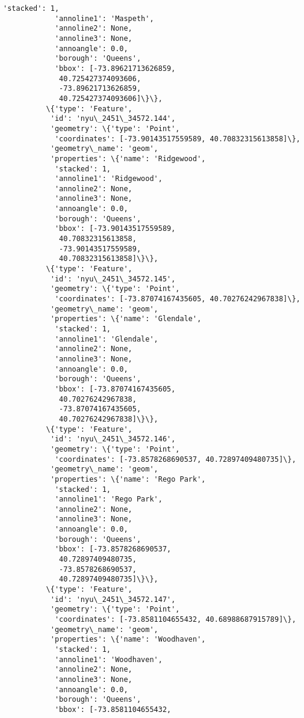 \documentclass[11pt]{article}
\begin{document}
\begin{Verbatim}[commandchars=\\\{\}]
            'stacked': 1,
            'annoline1': 'Maspeth',
            'annoline2': None,
            'annoline3': None,
            'annoangle': 0.0,
            'borough': 'Queens',
            'bbox': [-73.89621713626859,
             40.725427374093606,
             -73.89621713626859,
             40.725427374093606]\}\},
          \{'type': 'Feature',
           'id': 'nyu\_2451\_34572.144',
           'geometry': \{'type': 'Point',
            'coordinates': [-73.90143517559589, 40.70832315613858]\},
           'geometry\_name': 'geom',
           'properties': \{'name': 'Ridgewood',
            'stacked': 1,
            'annoline1': 'Ridgewood',
            'annoline2': None,
            'annoline3': None,
            'annoangle': 0.0,
            'borough': 'Queens',
            'bbox': [-73.90143517559589,
             40.70832315613858,
             -73.90143517559589,
             40.70832315613858]\}\},
          \{'type': 'Feature',
           'id': 'nyu\_2451\_34572.145',
           'geometry': \{'type': 'Point',
            'coordinates': [-73.87074167435605, 40.70276242967838]\},
           'geometry\_name': 'geom',
           'properties': \{'name': 'Glendale',
            'stacked': 1,
            'annoline1': 'Glendale',
            'annoline2': None,
            'annoline3': None,
            'annoangle': 0.0,
            'borough': 'Queens',
            'bbox': [-73.87074167435605,
             40.70276242967838,
             -73.87074167435605,
             40.70276242967838]\}\},
          \{'type': 'Feature',
           'id': 'nyu\_2451\_34572.146',
           'geometry': \{'type': 'Point',
            'coordinates': [-73.8578268690537, 40.72897409480735]\},
           'geometry\_name': 'geom',
           'properties': \{'name': 'Rego Park',
            'stacked': 1,
            'annoline1': 'Rego Park',
            'annoline2': None,
            'annoline3': None,
            'annoangle': 0.0,
            'borough': 'Queens',
            'bbox': [-73.8578268690537,
             40.72897409480735,
             -73.8578268690537,
             40.72897409480735]\}\},
          \{'type': 'Feature',
           'id': 'nyu\_2451\_34572.147',
           'geometry': \{'type': 'Point',
            'coordinates': [-73.8581104655432, 40.68988687915789]\},
           'geometry\_name': 'geom',
           'properties': \{'name': 'Woodhaven',
            'stacked': 1,
            'annoline1': 'Woodhaven',
            'annoline2': None,
            'annoline3': None,
            'annoangle': 0.0,
            'borough': 'Queens',
            'bbox': [-73.8581104655432,

\end{Verbatim}
\end{document}
